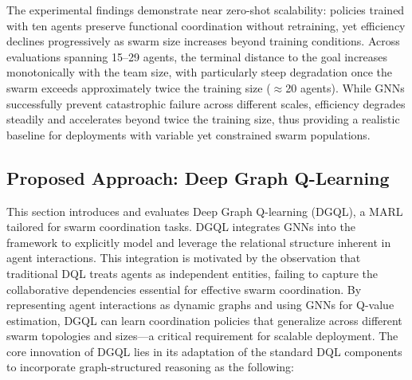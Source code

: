 The experimental findings demonstrate near zero-shot scalability: 
 policies trained with ten agents preserve functional coordination without retraining, 
 yet efficiency declines progressively as swarm size increases beyond training conditions. 
%
Across evaluations spanning 15--29 agents, 
 the terminal distance to the goal increases monotonically with the team size, 
 with particularly steep degradation once the swarm exceeds approximately twice 
 the training size ($\approx$20 agents). 
%
While \glspl{GNN} successfully prevent catastrophic failure across different scales, 
 efficiency degrades steadily and accelerates beyond twice the training size, 
 thus providing a realistic baseline for deployments with variable yet constrained 
 swarm populations.

\subsection{Proposed Approach: Deep Graph Q-Learning}

This section introduces and evaluates Deep Graph Q-learning (DGQL), 
 a \gls{MARL} tailored for swarm coordination tasks.
% 
DGQL integrates \glspl{GNN} into the 
 ~\cite{DBLP:journals/nature/MnihKSRVBGRFOPB15} 
 framework to explicitly model and leverage the relational structure 
 inherent in agent interactions. 
% 
This integration is motivated 
 by the observation that traditional \gls{DQL} treats agents as independent entities, 
 failing to capture the collaborative dependencies essential for effective swarm coordination.
% 
By representing agent interactions as dynamic graphs and using \glspl{GNN} for Q-value estimation, 
 DGQL can learn coordination policies that generalize across different swarm topologies 
 and sizes---a critical requirement for scalable deployment.
% 
The core innovation of DGQL lies in its adaptation of the standard \gls{DQL} components 
 to incorporate graph-structured reasoning as the following:

